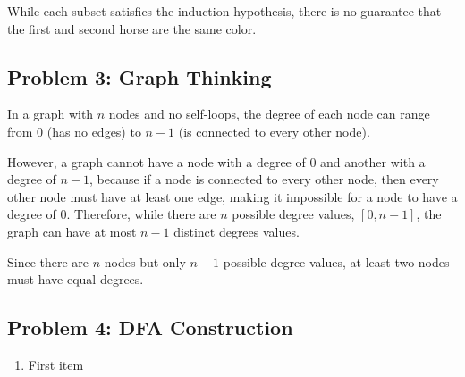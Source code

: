 \documentclass{article}
\begin{document}
While each subset satisfies the induction hypothesis, there is no guarantee that the first and second horse are the same color.

\subsection*{Problem 3: Graph Thinking}

In a graph with $n$ nodes and no self-loops, the degree of each node can range from $0$ (has no edges) to $n-1$ (is connected to every other node).
\vspace{1em}

However, a graph cannot have a node with a degree of $0$ and another with a degree of $n-1$, because if a node is connected to every other node, then every other node must have at least one edge, making it impossible for a node to have a degree of $0$. Therefore, while there are $n$ possible degree values, $[0, n-1]$, the graph can have at most $n-1$ distinct degrees values.
\vspace{1em}

Since there are $n$ nodes but only $n-1$ possible degree values, at least two nodes must have equal degrees.

\subsection*{Problem 4: DFA Construction}

\begin{enumerate}[label=\Alph*.]
    \item First item
\end{enumerate}
\end{document}
